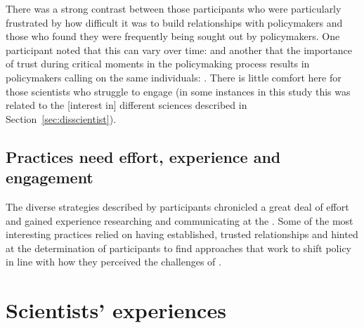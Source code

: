 There was a strong contrast between those participants who were particularly frustrated by how difficult it was to build relationships with policymakers and those who found they were frequently being sought out by policymakers. One participant noted that this can vary over time:  and another that the importance of trust during critical moments in the policymaking process results in policymakers calling on the same individuals: . There is little comfort here for those scientists who struggle to engage (in some instances in this study this was related to the [interest in] different sciences described in Section~\ref{sec:disscientist}).

\subsection{Practices need effort, experience and engagement}

The diverse strategies described by participants chronicled a great deal of effort and gained experience researching and communicating at the \SPI. Some of the most interesting practices relied on having established, trusted relationships and hinted at the determination of participants to find approaches that work to shift policy in line with how they perceived the challenges of \CAN.  

\section{Scientists' experiences}\label{sec:disexperience}

